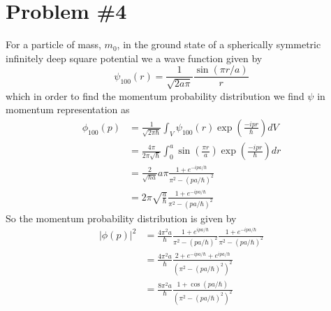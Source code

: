 \documentclass[11pt]{article}
\numberwithin{equation}{section}
\begin{document}
\section{Problem \#4}
For a particle of mass, $m_0$, in the ground state of a spherically symmetric infinitely 
deep square potential we a wave function given by
$$\psi_{100}(r) = \frac{1}{\sqrt{2a\pi}}\frac{\sin(\pi{r}/a)}{r}$$
which in order to find the momentum probability distribution we find $\psi$ in momentum 
representation as
\begin{align*}
\phi_{100}(p) &= \frac{1}{\sqrt{2\pi\hbar}}\int_{V}\psi_{100}(r)\exp\left(\frac{-ipr}{\hbar}\right)dV\\
&= \frac{4\pi}{2\pi\sqrt{\hbar}}\int_{0}^a\sin\left(\frac{\pi{r}}{a}\right)\exp\left(\frac{-ipr}{\hbar}\right)dr\\
&= \frac{2}{\sqrt{\hbar{a}}}a\pi\frac{1+e^{-ipa/\hbar}}{\pi^2-(pa/\hbar)^2}\\
&= 2\pi\sqrt{\frac{a}{\hbar}}\frac{1+e^{-ipa/\hbar}}{\pi^2-(pa/\hbar)^2}
\end{align*}
So the momentum probability distribution is given by
\begin{align*}
|\phi(p)|^2 &= \frac{4\pi^2{a}}{\hbar}\frac{1+e^{ipa/\hbar}}{\pi^2-(pa/\hbar)^2}\frac{1+e^{-ipa/\hbar}}{\pi^2-(pa/\hbar)^2}\\
&= \frac{4\pi^2{a}}{\hbar}\frac{2 + e^{-ipa/\hbar} + e^{ipa/\hbar}}{(\pi^2-(pa/\hbar)^2)^2}\\
&= \frac{8\pi^2{a}}{\hbar}\frac{1 + \cos(pa/\hbar)}{(\pi^2-(pa/\hbar)^2)^2}
\end{align*}
\end{document}
